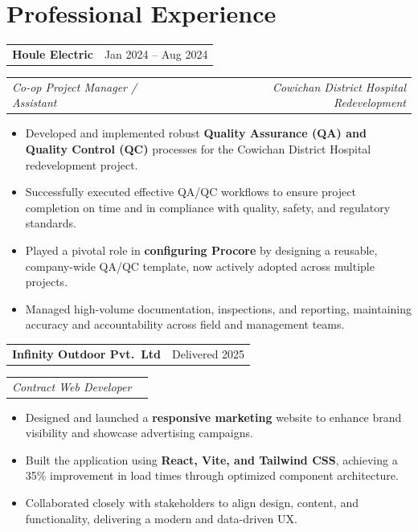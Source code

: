 \documentclass[9pt]{extarticle}
\makeatletter
\newcommand{\row}[2]{%
	\begin{tabular*}{\textwidth}{@{}l@{\extracolsep{\fill}}r@{}}%
		#1 & #2 \\
	\end{tabular*}%
}
\newcommand{\rowit}[2]{%
	\begin{tabular*}{\textwidth}{@{}l@{\extracolsep{\fill}}r@{}}%
		\textit{#1} & \textit{#2} \\
	\end{tabular*}%
}
\newcommand{\tightitemize}{\begin{itemize}}
\newcommand{\afterlist}{\vspace{2pt}}
\makeatother
\begin{document}
		\section{Professional Experience}
		
		\row{\textbf{Houle Electric}}{Jan 2024 -- Aug 2024}
		\rowit{Co-op Project Manager / Assistant}{Cowichan District Hospital Redevelopment}
		\tightitemize
			\item Developed and implemented robust \textbf{Quality Assurance (QA) and Quality Control (QC)} processes for the Cowichan District Hospital redevelopment project.
			\item Successfully executed effective QA/QC workflows to ensure project completion on time and in compliance with quality, safety, and regulatory standards.
			\item Played a pivotal role in \textbf{configuring Procore} by designing a reusable, company-wide QA/QC template, now actively adopted across multiple projects.
			\item Managed high-volume documentation, inspections, and reporting, maintaining accuracy and accountability across field and management teams.
		\end{itemize}
		\afterlist
	
		\row{\textbf{Infinity Outdoor Pvt.\ Ltd}}{Delivered 2025}
		\rowit{Contract Web Developer}{}
		\tightitemize
			 \item Designed and launched a \textbf{responsive marketing} website to enhance brand visibility and showcase advertising campaigns.
			\item Built the application using \textbf{React, Vite, and Tailwind CSS}, achieving a 35\% improvement in load times through optimized component architecture.
			\item Collaborated closely with stakeholders to align design, content, and functionality, delivering a modern and data-driven UX.
		\end{itemize}
		\afterlist
\end{document}
